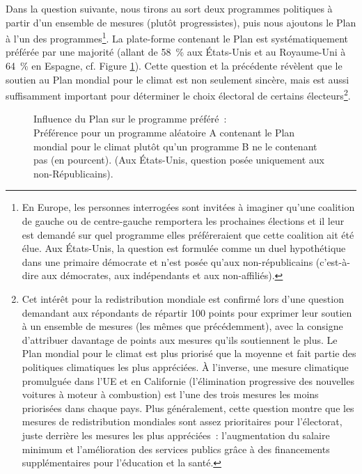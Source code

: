 \documentclass[a5paper,french,openany]{memoir}
\begin{document}
Dans la question suivante, nous tirons au sort deux programmes politiques à partir d'un ensemble de mesures (plutôt progressistes), puis nous ajoutons le Plan à l'un des programmes\footnote{En Europe, les personnes interrogées sont invitées à imaginer qu'une coalition de gauche ou de centre-gauche remportera les prochaines élections et il leur est demandé sur quel programme elles préféreraient que cette coalition ait été élue. Aux États-Unis, la question est formulée comme un duel hypothétique dans une primaire démocrate et n'est posée qu'aux non-républicains (c'est-à-dire aux démocrates, aux indépendants et aux non-affiliés).}. La plate-forme contenant le Plan est systématiquement préférée par une majorité (allant de 58~\% aux États-Unis et au Royaume-Uni à 64~\% en Espagne, cf. Figure \ref{fig:conjoint_left_ag_b}). Cette question et la précédente révèlent que le soutien au Plan mondial pour le climat est non seulement sincère, mais est aussi suffisamment important pour déterminer le choix électoral de certains électeurs\footnote{
Cet intérêt pour 
la redistribution mondiale est confirmé lors d'une question demandant aux répondants de répartir 100 points pour exprimer leur soutien à un ensemble de mesures (les mêmes que précédemment), avec la consigne d'attribuer davantage de points aux mesures qu'ils soutiennent le plus. Le Plan mondial pour le climat est plus priorisé que la moyenne et fait partie des politiques climatiques les plus appréciées. À l'inverse, une mesure climatique promulguée dans l'UE et en Californie (l'élimination progressive des nouvelles voitures à moteur à combustion) est l'une des trois mesures les moins priorisées dans chaque pays. Plus généralement, cette question montre que les mesures de redistribution mondiales sont assez prioritaires pour l'électorat, juste derrière les mesures les plus appréciées~: l'augmentation du salaire minimum et l'amélioration des services publics grâce à des financements supplémentaires pour l'éducation et la santé.}. 

\begin{figure}[h!] 
  \caption[Influence du Plan sur le programme préféré]{Influence du Plan sur le programme préféré~:\\ Préférence pour un programme aléatoire A contenant le Plan mondial pour le climat plutôt qu'un programme B ne le contenant pas (en pourcent). (Aux États-Unis, question posée uniquement aux non-Républicains).}\label{fig:conjoint_left_ag_b}
\end{figure}
\end{document}
